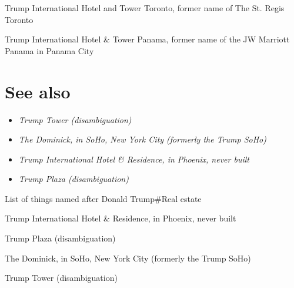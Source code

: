 Trump International Hotel and Tower Toronto, former name of The St.
Regis Toronto

Trump International Hotel \& Tower Panama, former name of the JW
Marriott Panama in Panama City

\section{See also}\label{see-also}

\begin{itemize}
\item
  \emph{Trump Tower (disambiguation)}
\item
  \emph{The Dominick, in SoHo, New York City (formerly the Trump SoHo)}
\item
  \emph{Trump International Hotel \& Residence, in Phoenix, never built}
\item
  \emph{Trump Plaza (disambiguation)}
\end{itemize}

List of things named after Donald Trump\#Real estate

Trump International Hotel \& Residence, in Phoenix, never built

Trump Plaza (disambiguation)

The Dominick, in SoHo, New York City (formerly the Trump SoHo)

Trump Tower (disambiguation)
